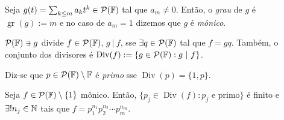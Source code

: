 \newcommand{\gr}{\operatorname{gr}}
\begin{definition}
    Seja \(g(t) = \sum_{k\leq m} a_k t^k \in \mathcal{P}(\mathbb{F})\) tal que \(a_m \neq 0\). Então, o \emph{grau} de \(g \) é \(\gr(g):= m\) e no caso de \(a_m =1\) dizemos que \(g\) é \emph{mônico}. 
\end{definition}


\newcommand{\dIv}{\operatorname{Div}}
\begin{definition}
    \(\mathcal{P}(\mathbb{F}) \ni g\) divide \(f \in \mathcal{P}(\mathbb{F})\), \(g\ | \ f\),  sse \(\exists q \in \mathcal{P}(\mathbb{F})\) tal que \(f = gq\). Também, o conjunto dos divisores é \(\dIv(f):= \{g\in \Pol : g\ | \ f\}\). 
\end{definition}

\begin{definition}
    Diz-se que \(p \in \mathcal{P}(\mathbb{F})\setminus \mathbb{F} \) é \emph{primo} sse \(\dIv(p) = \{1, p\}\). 
\end{definition}

\theoremnum{\ \hspace{-0.3cm}}
\begin{theorem}
    Seja \(f\in \mathcal{P}(\mathbb{F}) \setminus \{1\}\) mônico. Então, \(\{p_j \in \dIv(f): p_j \text{ e primo}\}\) é finito e \(\exists !n_j \in \mathbb{N}\) tais que \(f = p_1^{n_1}p_2^{n_2}\cdots p_m^{n_m}\). 
\end{theorem}

